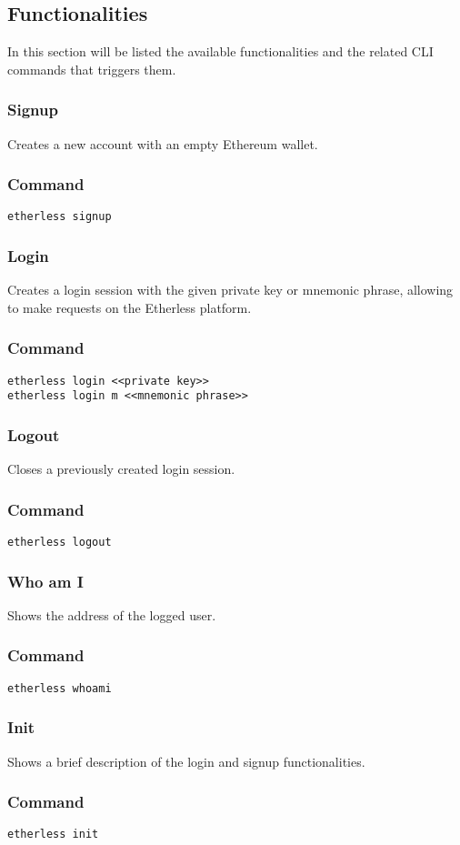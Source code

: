 \subsection{Functionalities}
	In this section will be listed the available functionalities and the related CLI commands that triggers them.
	\subsubsection{Signup}
	Creates a new account with an empty Ethereum wallet.
	\subsubsection*{Command}
	\texttt{etherless signup}
	\subsubsection{Login}
	Creates a login session with the given private key or mnemonic phrase, allowing to make requests on the Etherless platform.
	\subsubsection*{Command}
	\texttt{etherless login <<private key>>} \\
	\texttt{etherless login m <<mnemonic phrase>>}
	\subsubsection{Logout}
	Closes a previously created login session.
	\subsubsection*{Command}
	\texttt{etherless logout}
	\subsubsection{Who am I}
	Shows the address of the logged user.
	\subsubsection*{Command}
	\texttt{etherless whoami}
	\subsubsection{Init}
	Shows a brief description of the login and signup functionalities.
	\subsubsection*{Command}
	\texttt{etherless init}
